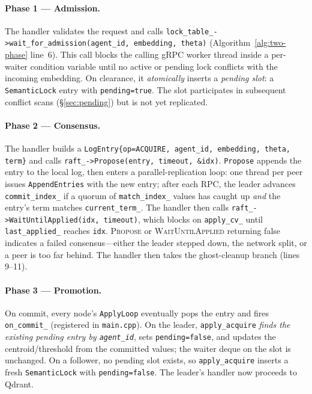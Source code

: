 \documentclass[sigconf]{acmart}
\begin{document}
\paragraph{\textbf{Phase 1 — Admission.}}
The handler validates the request and calls
\texttt{lock\_table\_->wait\_for\_admission(agent\_id, embedding, theta)}
(Algorithm~\ref{alg:two-phase} line~6). This call blocks the calling
gRPC worker thread inside a per-waiter condition variable until no active
or pending lock conflicts with the incoming embedding. On clearance, it
\emph{atomically} inserts a \emph{pending slot}: a \texttt{SemanticLock}
entry with \texttt{pending=true}. The slot participates in subsequent
conflict scans (\S\ref{sec:pending}) but is not yet replicated.

\paragraph{\textbf{Phase 2 — Consensus.}}
The handler builds a \texttt{LogEntry\{op=ACQUIRE, agent\_id, embedding,
theta, term\}} and calls \texttt{raft\_->Propose(entry, timeout,
\&idx)}. \texttt{Propose} appends the entry to the local log, then enters
a parallel-replication loop: one thread per peer issues
\texttt{AppendEntries} with the new entry; after each RPC, the leader
advances \texttt{commit\_index\_} if a quorum of \texttt{match\_index\_}
values has caught up \emph{and} the entry's term matches
\texttt{current\_term\_}. The handler then calls
\texttt{raft\_->WaitUntilApplied(idx, timeout)}, which blocks on
\texttt{apply\_cv\_} until \texttt{last\_applied\_} reaches \texttt{idx}.
\textsc{Propose} or \textsc{WaitUntilApplied} returning false indicates a
failed consensus---either the leader stepped down, the network split, or a
peer is too far behind. The handler then takes the ghost-cleanup branch
(lines 9--11).

\paragraph{\textbf{Phase 3 — Promotion.}}
On commit, every node's \texttt{ApplyLoop} eventually pops the entry and
fires \texttt{on\_commit\_} (registered in \texttt{main.cpp}). On the
leader, \texttt{apply\_acquire} \emph{finds the existing pending entry by
\texttt{agent\_id}}, sets \texttt{pending=false}, and updates the
centroid/threshold from the committed values; the waiter deque on the
slot is unchanged. On a follower, no pending slot exists, so
\texttt{apply\_acquire} inserts a fresh \texttt{SemanticLock} with
\texttt{pending=false}. The leader's handler now proceeds to Qdrant.
\end{document}
